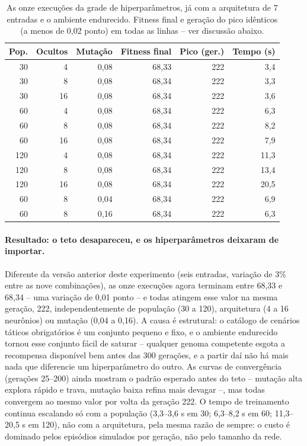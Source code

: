 \documentclass[12pt,a4paper]{article}
\begin{document}
\begin{table}[htbp]
  \centering
  \caption{As onze execuções da grade de hiperparâmetros, já com a arquitetura de 7 entradas e o
  ambiente endurecido. Fitness final e geração do pico idênticos (a menos de 0,02 ponto) em todas
  as linhas -- ver discussão abaixo.}
  \label{tab:hiperparametros-7entradas}
  \small
  \renewcommand{\arraystretch}{1.25}
  \begin{tabular}{rrrrrr}
    \toprule
    \rowcolor{gray!15}
    \textbf{Pop.} & \textbf{Ocultos} & \textbf{Mutação} & \textbf{Fitness final} & \textbf{Pico (ger.)} & \textbf{Tempo (s)} \\
    \midrule
    30  & 4  & 0,08 & 68,33 & 222 & 3,4 \\
    \rowcolor{gray!8}
    30  & 8  & 0,08 & 68,34 & 222 & 3,3 \\
    30  & 16 & 0,08 & 68,34 & 222 & 3,6 \\
    \rowcolor{gray!8}
    60  & 4  & 0,08 & 68,34 & 222 & 6,3 \\
    60  & 8  & 0,08 & 68,34 & 222 & 8,2 \\
    \rowcolor{gray!8}
    60  & 16 & 0,08 & 68,34 & 222 & 7,9 \\
    120 & 4  & 0,08 & 68,34 & 222 & 11,3 \\
    \rowcolor{gray!8}
    120 & 8  & 0,08 & 68,34 & 222 & 13,4 \\
    120 & 16 & 0,08 & 68,34 & 222 & 20,5 \\
    \rowcolor{gray!8}
    60  & 8  & 0,04 & 68,34 & 222 & 6,9 \\
    60  & 8  & 0,16 & 68,34 & 222 & 6,3 \\
    \bottomrule
  \end{tabular}
\end{table}

\paragraph{Resultado: o teto desapareceu, e os hiperparâmetros deixaram de importar.}
Diferente da versão anterior deste experimento (seis entradas, variação de 3\% entre as nove
combinações), as onze execuções agora terminam entre 68,33 e 68,34 -- uma variação de 0,01 ponto --
e todas atingem esse valor na mesma geração, 222, independentemente de população (30 a 120),
arquitetura (4 a 16 neurônios) ou mutação (0,04 a 0,16). A causa é estrutural: o catálogo de
cenários táticos obrigatórios é um conjunto pequeno e fixo, e o ambiente
endurecido tornou esse conjunto fácil de saturar -- qualquer genoma competente esgota a recompensa
disponível bem antes das 300 gerações, e a partir daí não há mais nada que diferencie um
hiperparâmetro do outro. As curvas de convergência (gerações 25--200) ainda mostram o padrão
esperado antes do teto -- mutação alta explora rápido e trava, mutação baixa refina mais devagar --,
mas todas convergem ao mesmo valor por volta da geração 222. O tempo de treinamento continua
escalando só com a população (3,3--3,6 s em 30; 6,3--8,2 s em 60; 11,3--20,5 s em 120), não com a
arquitetura, pela mesma razão de sempre: o custo é dominado pelos episódios simulados por geração,
não pelo tamanho da rede.
\end{document}
